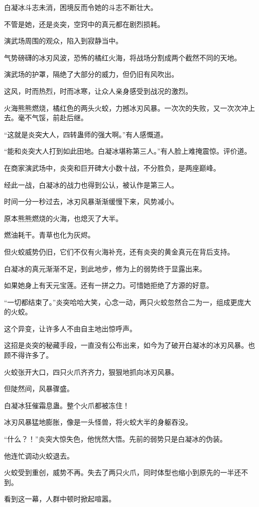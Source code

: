 \begin{this_body}
白凝冰斗志未消，困境反而令她的斗志不断壮大。

不管是她，还是炎突，空窍中的真元都在剧烈损耗。

演武场周围的观众，陷入到寂静当中。

气势磅礴的冰刃风波，恐怖的橘红火海，将战场分割成两个截然不同的天地。

演武场的护罩，隔绝了大部分的威力，但仍旧有风吹出。

这风，时而热烈，时而冰寒，让众人亲身感受到战况的激烈。

火海熊熊燃烧，橘红色的两头火蛟，力撼冰刃风暴。一次次的失败，又一次次冲上去。毫不气馁，前赴后继。

“这就是炎突大人，四转蛊师的强大啊。”有人感慨道。

“能和炎突大人打到如此田地。白凝冰堪称第三人。”有人脸上难掩震惊。评价道。

在商家演武场中，炎突和巨开碑大小数十战，不分胜负，是两座巅峰。

经此一战，白凝冰的战力也得到公认，被认作是第三人。

时间一分一秒过去，冰刃风暴渐渐缓慢下来，风势减小。

原本熊熊燃烧的火海，也熄灭了大半。

燃油耗干。青草也化为灰烬。

但火蛟威势仍旧，它们不仅有火海补充，还有炎突的黄金真元在背后支持。

白凝冰的真元渐渐不足，到此地步，修为上的弱势终于显露出来。

如果她身上有天元宝莲。还有一拼之力。可惜她拒绝了方源的好意。

“一切都结束了。”炎突哈哈大笑，心念一动，两只火蛟忽然合二为一，组成更庞大的火蛟。

这个异变，让许多人不由自主地出惊呼声。

这招是炎突的秘藏手段，一直没有公布出来，如今为了破开白凝冰的冰刃风暴。也顾不得许多了。

火蛟张开大口，四只火爪齐齐力，狠狠地抓向冰刃风暴。

但陡然间，风暴骤盛。

白凝冰狂催霜息蛊。整个火爪都被冻住！

冰刃风暴猛地膨胀，像是一头怪兽，将火蛟大半的身躯吞没。

“什么？！”炎突大惊失色，他恍然大悟。先前的弱势只是白凝冰的伪装。

他连忙调动火蛟退去。

火蛟受到重创，威势不再。失去了两只火爪，同时体型也缩小到原先的一半还不到。

看到这一幕，人群中顿时掀起喧嚣。


\end{this_body}
